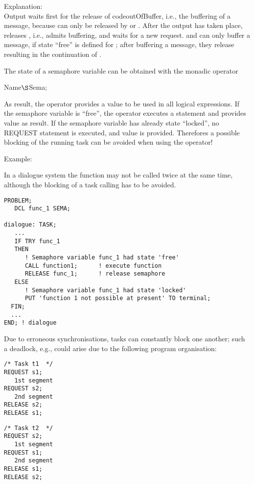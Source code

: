 Explanation:\\
Output waits first for the release of code{outOfBuffer}, i.e., the
buffering of a message, because  can only be released by
 or .
After the output has taken place, 
releases , i.e., admits buffering, and waits for a new
request.  and  can only buffer a message, if state
``free'' is defined for ; after buffering a message, they
release  resulting in the continuation of .

The state of a semaphore variable can be obtained with the monadic
operator

 Name$\S $Sema;

As result, the operator provides a  value to be used in all
logical expressions. If the semaphore variable is ``free'', the operator
executes a  statement and provides value  as result. If the
semaphore variable has already state ``locked'', no REQUEST statement
is executed, and value  is provided. Therefores a possible blocking 
of the running task can be avoided when using the  operator!

Example:

In a dialogue system the function 
 may not be called twice at the same time, although the
blocking of a task calling  has to be avoided.

\begin{lstlisting}
PROBLEM;
   DCL func_1 SEMA; 

dialogue: TASK;
   ...
   IF TRY func_1
   THEN
      ! Semaphore variable func_1 had state 'free' 
      CALL function1;      ! execute function
      RELEASE func_1;      ! release semaphore 
   ELSE
      ! Semaphore variable func_1 had state 'locked'
      PUT 'function 1 not possible at present' TO terminal;
  FIN;
  ...
END; ! dialogue 
\end{lstlisting}

Due to erroneous synchronisations, tasks can constantly block one
another; such a deadlock, e.g., could arise due to the following program
organisation:

\begin{multicols}{2}
\begin{lstlisting}
/* Task t1  */
REQUEST s1; 
   1st segment 
REQUEST s2; 
   2nd segment 
RELEASE s2; 
RELEASE s1;
\end{lstlisting}
\columnbreak
\begin{lstlisting}
/* Task t2  */
REQUEST s2; 
   1st segment 
REQUEST s1; 
   2nd segment 
RELEASE s1; 
RELEASE s2;
\end{lstlisting}
\end{multicols}

